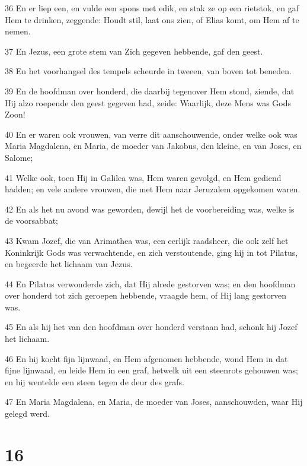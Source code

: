 \par 36 En er liep een, en vulde een spons met edik, en stak ze op een rietstok, en gaf Hem te drinken, zeggende: Houdt stil, laat ons zien, of Elias komt, om Hem af te nemen.
\par 37 En Jezus, een grote stem van Zich gegeven hebbende, gaf den geest.
\par 38 En het voorhangsel des tempels scheurde in tweeen, van boven tot beneden.
\par 39 En de hoofdman over honderd, die daarbij tegenover Hem stond, ziende, dat Hij alzo roepende den geest gegeven had, zeide: Waarlijk, deze Mens was Gods Zoon!
\par 40 En er waren ook vrouwen, van verre dit aanschouwende, onder welke ook was Maria Magdalena, en Maria, de moeder van Jakobus, den kleine, en van Joses, en Salome;
\par 41 Welke ook, toen Hij in Galilea was, Hem waren gevolgd, en Hem gediend hadden; en vele andere vrouwen, die met Hem naar Jeruzalem opgekomen waren.
\par 42 En als het nu avond was geworden, dewijl het de voorbereiding was, welke is de voorsabbat;
\par 43 Kwam Jozef, die van Arimathea was, een eerlijk raadsheer, die ook zelf het Koninkrijk Gods was verwachtende, en zich verstoutende, ging hij in tot Pilatus, en begeerde het lichaam van Jezus.
\par 44 En Pilatus verwonderde zich, dat Hij alrede gestorven was; en den hoofdman over honderd tot zich geroepen hebbende, vraagde hem, of Hij lang gestorven was.
\par 45 En als hij het van den hoofdman over honderd verstaan had, schonk hij Jozef het lichaam.
\par 46 En hij kocht fijn lijnwaad, en Hem afgenomen hebbende, wond Hem in dat fijne lijnwaad, en leide Hem in een graf, hetwelk uit een steenrots gehouwen was; en hij wentelde een steen tegen de deur des grafs.
\par 47 En Maria Magdalena, en Maria, de moeder van Joses, aanschouwden, waar Hij gelegd werd.

\chapter{16}


